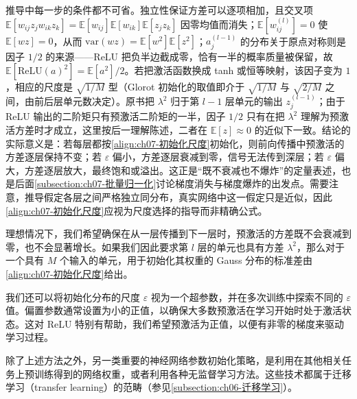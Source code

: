 \documentclass[../../main.tex]{subfiles}
\begin{document}
\begin{remark}
推导中每一步的条件都不可省。独立性保证方差可以逐项相加，且交叉项 $\mathbb{E}[w_{ij}z_jw_{ik}z_k]=\mathbb{E}[w_{ij}]\mathbb{E}[w_{ik}]\mathbb{E}[z_jz_k]$ 因零均值而消失；$\mathbb{E}[w_{ij}^{(l)}]=0$ 使 $\mathbb{E}[wz]=0$，从而 $\mathrm{var}(wz)=\mathbb{E}[w^{2}]\mathbb{E}[z^{2}]$；$a_j^{(l-1)}$ 的分布关于原点对称则是因子 $1/2$ 的来源——ReLU 把负半边截成零，恰有一半的概率质量被保留，故 $\mathbb{E}[\mathrm{ReLU}(a)^{2}]=\mathbb{E}[a^{2}]/2$。若把激活函数换成 tanh 或恒等映射，该因子变为 $1$，相应的尺度是 $\sqrt{1/M}$ 型（Glorot 初始化的取值即介于 $\sqrt{1/M}$ 与 $\sqrt{2/M}$ 之间，由前后层单元数决定）。原书把 $\lambda^{2}$ 归于第 $l-1$ 层单元的输出 $z_j^{(l-1)}$；由于 ReLU 输出的二阶矩只有预激活二阶矩的一半，因子 $1/2$ 只有在把 $\lambda^{2}$ 理解为预激活方差时才成立，这里按后一理解陈述，二者在 $\mathbb{E}[z]\approx0$ 的近似下一致。结论的实际意义是：若每层都按\eqref{align:ch07-初始化尺度}初始化，则前向传播中预激活的方差逐层保持不变；若 $\varepsilon$ 偏小，方差逐层衰减到零，信号无法传到深层；若 $\varepsilon$ 偏大，方差逐层放大，最终饱和或溢出。这正是“既不衰减也不爆炸”的定量表述，也是后面\cref{subsection:ch07-批量归一化}讨论梯度消失与梯度爆炸的出发点。需要注意，推导假定各层之间严格独立同分布，真实网络中这一假定只是近似，因此\eqref{align:ch07-初始化尺度}应视为尺度选择的指导而非精确公式。
\end{remark}

理想情况下，我们希望确保在从一层传播到下一层时，预激活的方差既不会衰减到零，也不会显著增长。如果我们因此要求第 $l$ 层的单元也具有方差 $\lambda^{2}$，那么对于一个具有 $M$ 个输入的单元，用于初始化其权重的 Gauss 分布的标准差由\eqref{align:ch07-初始化尺度}给出。

我们还可以将初始化分布的尺度 $\varepsilon$ 视为一个超参数，并在多次训练中探索不同的 $\varepsilon$ 值。偏置参数通常设置为小的正值，以确保大多数预激活在学习开始时处于激活状态。这对 ReLU 特别有帮助，我们希望预激活为正值，以便有非零的梯度来驱动学习过程。

除了上述方法之外，另一类重要的神经网络参数初始化策略，是利用在其他相关任务上预训练得到的网络权重，或者利用各种无监督学习方法。这些技术都属于迁移学习（transfer learning）的范畴（参见\cref{subsection:ch06-迁移学习}）。
\end{document}
